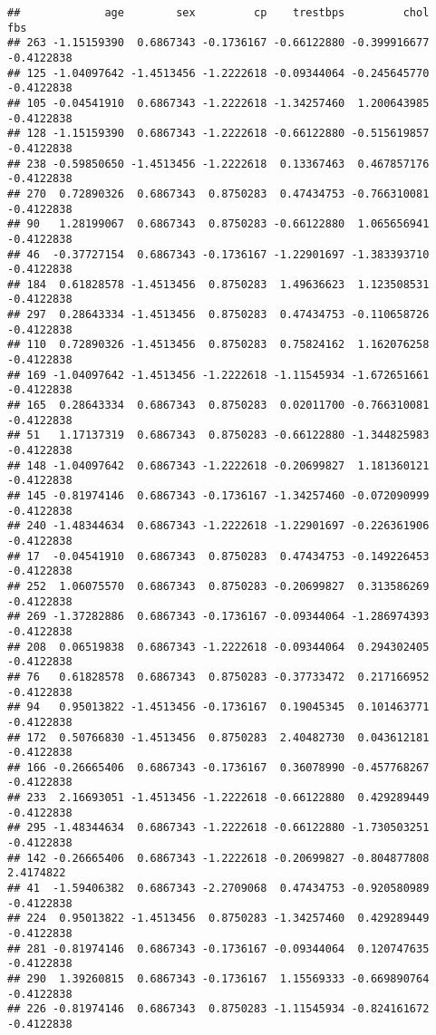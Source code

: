 \documentclass[
]{article}
\begin{document}
\begin{verbatim}
##             age        sex         cp    trestbps         chol        fbs
## 263 -1.15159390  0.6867343 -0.1736167 -0.66122880 -0.399916677 -0.4122838
## 125 -1.04097642 -1.4513456 -1.2222618 -0.09344064 -0.245645770 -0.4122838
## 105 -0.04541910  0.6867343 -1.2222618 -1.34257460  1.200643985 -0.4122838
## 128 -1.15159390  0.6867343 -1.2222618 -0.66122880 -0.515619857 -0.4122838
## 238 -0.59850650 -1.4513456 -1.2222618  0.13367463  0.467857176 -0.4122838
## 270  0.72890326  0.6867343  0.8750283  0.47434753 -0.766310081 -0.4122838
## 90   1.28199067  0.6867343  0.8750283 -0.66122880  1.065656941 -0.4122838
## 46  -0.37727154  0.6867343 -0.1736167 -1.22901697 -1.383393710 -0.4122838
## 184  0.61828578 -1.4513456  0.8750283  1.49636623  1.123508531 -0.4122838
## 297  0.28643334 -1.4513456  0.8750283  0.47434753 -0.110658726 -0.4122838
## 110  0.72890326 -1.4513456  0.8750283  0.75824162  1.162076258 -0.4122838
## 169 -1.04097642 -1.4513456 -1.2222618 -1.11545934 -1.672651661 -0.4122838
## 165  0.28643334  0.6867343  0.8750283  0.02011700 -0.766310081 -0.4122838
## 51   1.17137319  0.6867343  0.8750283 -0.66122880 -1.344825983 -0.4122838
## 148 -1.04097642  0.6867343 -1.2222618 -0.20699827  1.181360121 -0.4122838
## 145 -0.81974146  0.6867343 -0.1736167 -1.34257460 -0.072090999 -0.4122838
## 240 -1.48344634  0.6867343 -1.2222618 -1.22901697 -0.226361906 -0.4122838
## 17  -0.04541910  0.6867343  0.8750283  0.47434753 -0.149226453 -0.4122838
## 252  1.06075570  0.6867343  0.8750283 -0.20699827  0.313586269 -0.4122838
## 269 -1.37282886  0.6867343 -0.1736167 -0.09344064 -1.286974393 -0.4122838
## 208  0.06519838  0.6867343 -1.2222618 -0.09344064  0.294302405 -0.4122838
## 76   0.61828578  0.6867343  0.8750283 -0.37733472  0.217166952 -0.4122838
## 94   0.95013822 -1.4513456 -0.1736167  0.19045345  0.101463771 -0.4122838
## 172  0.50766830 -1.4513456  0.8750283  2.40482730  0.043612181 -0.4122838
## 166 -0.26665406  0.6867343 -0.1736167  0.36078990 -0.457768267 -0.4122838
## 233  2.16693051 -1.4513456 -1.2222618 -0.66122880  0.429289449 -0.4122838
## 295 -1.48344634  0.6867343 -1.2222618 -0.66122880 -1.730503251 -0.4122838
## 142 -0.26665406  0.6867343 -1.2222618 -0.20699827 -0.804877808  2.4174822
## 41  -1.59406382  0.6867343 -2.2709068  0.47434753 -0.920580989 -0.4122838
## 224  0.95013822 -1.4513456  0.8750283 -1.34257460  0.429289449 -0.4122838
## 281 -0.81974146  0.6867343 -0.1736167 -0.09344064  0.120747635 -0.4122838
## 290  1.39260815  0.6867343 -0.1736167  1.15569333 -0.669890764 -0.4122838
## 226 -0.81974146  0.6867343  0.8750283 -1.11545934 -0.824161672 -0.4122838

\end{verbatim}
\end{document}
